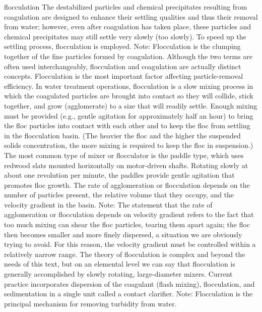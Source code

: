 \documentclass{article}
\begin{document}
flocculation The destabilized particles and chemical precipitates
resulting from coagulation are designed to enhance their settling
qualities and thus their removal from water; however, even after
coagulation has taken place, these particles and chemical precipitates
may still settle very slowly (too slowly). To speed up the settling
process, flocculation is employed. Note: Flocculation is the clumping
together of the fine particles formed by coagulation. Although the two
terms are often used interchangeably, flocculation and coagulation are
actually distinct concepts. Flocculation is the most important factor
affecting particle-removal efficiency. In water treatment operations,
flocculation is a slow mixing process in which the coagulated particles
are brought into contact so they will collide, stick together, and grow
(agglomerate) to a size that will readily settle. Enough mixing must be
provided (e.g., gentle agitation for approximately half an hour) to
bring the floc particles into contact with each other and to keep the
floc from settling in the flocculation basin. (The heavier the floc and
the higher the suspended solids concentration, the more mixing is
required to keep the floc in suspension.) The most common type of mixer
or flocculator is the paddle type, which uses redwood slats mounted
horizontally on motor-driven shafts. Rotating slowly at about one
revolution per minute, the paddles provide gentle agitation that
promotes floc growth. The rate of agglomeration or flocculation depends
on the number of particles present, the relative volume that they
occupy, and the velocity gradient in the basin. Note: The statement that
the rate of agglomeration or flocculation depends on velocity gradient
refers to the fact that too much mixing can shear the floc particles,
tearing them apart again; the floc then becomes smaller and more finely
dispersed, a situation we are obviously trying to avoid. For this
reason, the velocity gradient must be controlled within a relatively
narrow range. The theory of flocculation is complex and beyond the needs
of this text, but on an elemental level we can say that flocculation is
generally accomplished by slowly rotating, large-diameter mixers.
Current practice incorporates dispersion of the coagulant (flash
mixing), flocculation, and sedimentation in a single unit called a
contact clarifier. Note: Flocculation is the principal mechanism for
removing turbidity from water.
\end{document}
